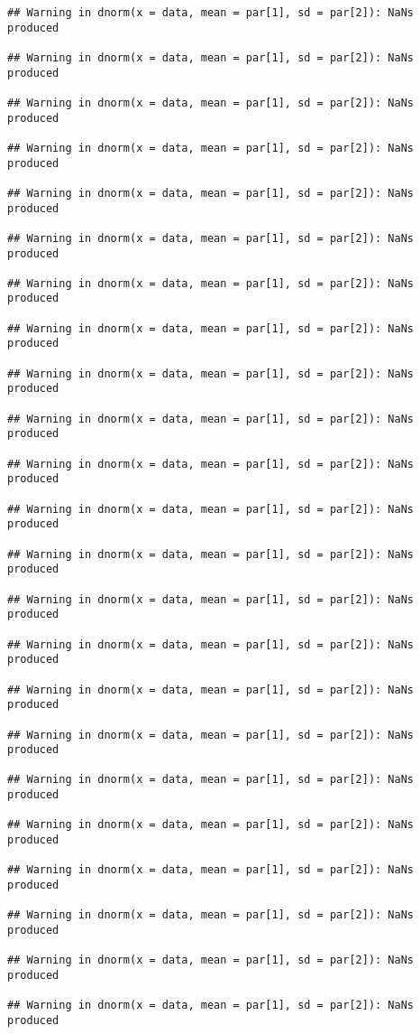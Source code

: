 \documentclass[
]{article}
\begin{document}
\begin{verbatim}
## Warning in dnorm(x = data, mean = par[1], sd = par[2]): NaNs produced

## Warning in dnorm(x = data, mean = par[1], sd = par[2]): NaNs produced

## Warning in dnorm(x = data, mean = par[1], sd = par[2]): NaNs produced

## Warning in dnorm(x = data, mean = par[1], sd = par[2]): NaNs produced

## Warning in dnorm(x = data, mean = par[1], sd = par[2]): NaNs produced

## Warning in dnorm(x = data, mean = par[1], sd = par[2]): NaNs produced

## Warning in dnorm(x = data, mean = par[1], sd = par[2]): NaNs produced

## Warning in dnorm(x = data, mean = par[1], sd = par[2]): NaNs produced

## Warning in dnorm(x = data, mean = par[1], sd = par[2]): NaNs produced

## Warning in dnorm(x = data, mean = par[1], sd = par[2]): NaNs produced

## Warning in dnorm(x = data, mean = par[1], sd = par[2]): NaNs produced

## Warning in dnorm(x = data, mean = par[1], sd = par[2]): NaNs produced

## Warning in dnorm(x = data, mean = par[1], sd = par[2]): NaNs produced

## Warning in dnorm(x = data, mean = par[1], sd = par[2]): NaNs produced

## Warning in dnorm(x = data, mean = par[1], sd = par[2]): NaNs produced

## Warning in dnorm(x = data, mean = par[1], sd = par[2]): NaNs produced

## Warning in dnorm(x = data, mean = par[1], sd = par[2]): NaNs produced

## Warning in dnorm(x = data, mean = par[1], sd = par[2]): NaNs produced

## Warning in dnorm(x = data, mean = par[1], sd = par[2]): NaNs produced

## Warning in dnorm(x = data, mean = par[1], sd = par[2]): NaNs produced

## Warning in dnorm(x = data, mean = par[1], sd = par[2]): NaNs produced

## Warning in dnorm(x = data, mean = par[1], sd = par[2]): NaNs produced

## Warning in dnorm(x = data, mean = par[1], sd = par[2]): NaNs produced


\end{verbatim}
\end{document}
